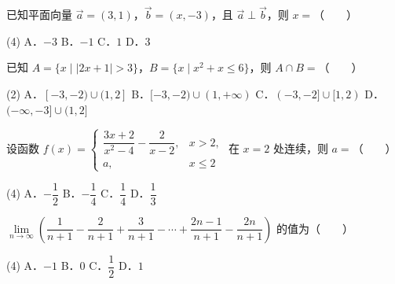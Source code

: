 

\begin{question}
已知平面向量 $\vec{a} = (3, 1)$，$\vec{b} = (x, -3)$，且 $\vec{a} \perp \vec{b}$，则 $x =$\mbox{（　　）}

\begin{gkopts}(4)
\task A．$-3$
\task B．$-1$
\task C．$1$
\task D．$3$
\end{gkopts}

\end{question}
\begin{question}
已知 $A = \{x \mid |2x + 1| > 3 \}$，$B = \{x \mid x^2 + x \leqslant 6 \}$，则 $A \cap B =$\mbox{（　　）}

\begin{gkopts}(2)
\task A．$[-3, -2) \cup (1, 2]$
\task B．$[-3, -2) \cup (1, +\infty)$
\task C．$(-3, -2] \cup [1, 2)$
\task D．$(-\infty, -3] \cup (1, 2]$
\end{gkopts}

\end{question}
\begin{question}
设函数 $f(x) = \begin{cases} \dfrac{3x + 2}{x^2 - 4} - \dfrac{2}{x - 2}, & x > 2, \\ a, & x \leqslant 2 \end{cases}$ 在 $x = 2$ 处连续，则 $a =$\mbox{（　　）}

\begin{gkopts}(4)
\task A．$-\dfrac{1}{2}$
\task B．$-\dfrac{1}{4}$
\task C．$\dfrac{1}{4}$
\task D．$\dfrac{1}{3}$
\end{gkopts}

\end{question}
\begin{question}
$\lim\limits_{n \to \infty} \left( \dfrac{1}{n+1} - \dfrac{2}{n+1} + \dfrac{3}{n+1} - \cdots + \dfrac{2n-1}{n+1} - \dfrac{2n}{n+1} \right)$ 的值为\mbox{（　　）}

\begin{gkopts}(4)
\task A．$-1$
\task B．$0$
\task C．$\dfrac{1}{2}$
\task D．$1$
\end{gkopts}

\end{question}
